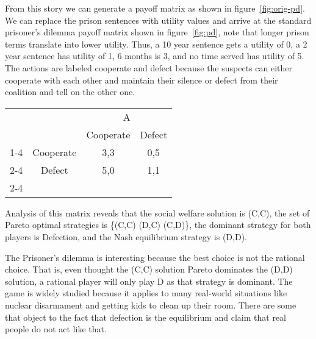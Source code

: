 From this story we can generate a payoff matrix as shown in
figure~\ref{fig:orig-pd}. We can replace the prison sentences with
utility values and arrive at the standard prisoner's dilemma payoff
matrix shown in figure~\ref{fig:pd}, note that longer prison terms
translate into lower utility. Thus, a 10 year sentence gets a utility
of 0, a 2 year sentence has utility of 1, 6 months is 3, and no time
served has utility of 5. The actions are labeled cooperate and defect
because the suspects can either cooperate with each other and maintain
their silence or defect from their coalition and tell on the other
one.

\begin{SCfigure}
  \begin{minipage}{1.0\linewidth}
    \begin{center}
      \renewcommand\arraystretch{1.5}
      \begin{tabular}{cc|c|c|}
        &    &\multicolumn{2}{c}{A} \\ 
        &      &Cooperate&Defect \\ \cline{1-4}
        \multirow{2}{2em}{B}
        & Cooperate  &3,3 & 0,5 \\ \cline{2-4}
        & Defect  &5,0 &1,1 \\ \cline{2-4}
      \end{tabular}
    \end{center}  
    \end{minipage}
  \caption{Prisoner's dilemma with standard payoff values.}
  \label{fig:pd}
\end{SCfigure}


Analysis of this matrix reveals that the social welfare solution is
(C,C), the set of Pareto optimal strategies is \{(C,C) (D,C) (C,D)\},
the dominant strategy for both players is Defection, and the Nash
equilibrium strategy is (D,D).
  
The Prisoner's dilemma is interesting because the best choice is not
the rational choice. That is, even thought the (C,C) solution Pareto
dominates the (D,D) solution, a rational player will only play D as
that strategy is dominant. The game is widely studied because it
applies to many real-world situations like nuclear disarmament and
getting kids to clean up their room. There are some that object to the
fact that defection is the equilibrium and claim that real people do
not act like that.

